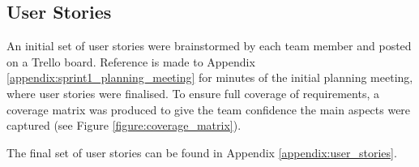 \subsection{User Stories}

An initial set of user stories were brainstormed by each team member and posted on a Trello board. 
Reference is made to Appendix \ref{appendix:sprint1_planning_meeting} for minutes of the initial planning meeting, where user stories were finalised.
To ensure full coverage of requirements, a coverage matrix was produced to give the team confidence the main aspects were captured (see Figure \ref{figure:coverage_matrix}).

The final set of user stories can be found in Appendix \ref{appendix:user_stories}.